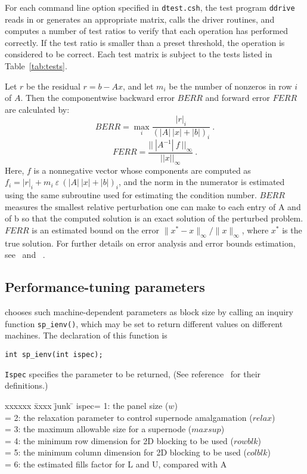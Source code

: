 For each command line option specified in {\tt dtest.csh}, the test program
{\tt ddrive} reads in or generates an appropriate matrix, calls the 
driver routines, and computes a number of test ratios to verify that 
each operation has performed correctly. If the test ratio is smaller than
a preset threshold, the operation is considered to be correct.
Each test matrix is subject to the tests listed in Table~\ref{tab:tests}.

Let $r$ be the residual $r=b-Ax$, and let $m_i$ be the number of nonzeros in 
row $i$ of $A$. Then the componentwise backward error $BERR$ and 
forward error $FERR$~\cite{lapackmanual2} are calculated by:
$$ BERR = \max_i\frac{|r|_i}{(|A|~|x|+|b|)_i}\ .$$
$$FERR = \frac{||~|A^{-1}|~f~||_\infty}{||x||_\infty}\ .$$
Here, $f$ is a nonnegative vector whose components are computed as
$f_i=|r|_i + m_i~\varepsilon~(|A|~|x|+|b|)_i$, and the norm in the numerator 
is estimated using the same subroutine used for estimating the
condition number. 
$BERR$ measures the smallest relative perturbation one can make to each 
entry of A and of b so that the computed solution is an exact
solution of the perturbed problem. $FERR$ is an estimated bound on 
the error $\| x^* - x \|_{\infty} / \| x \|_{\infty}$, where $x^*$ is 
the true solution.
For further details on error analysis and error bounds
estimation, see~\cite[Chapter 4]{lapackmanual2} and ~\cite{arioli89}.


\subsection{Performance-tuning parameters}
\label{sec:parameters}
{\superlu} chooses such machine-dependent parameters as block size by calling
an inquiry function {\tt sp\_ienv()}, which may be set to return different
values on different machines. The declaration of this function is

\vspace{.1in}
{\tt int sp\_ienv(int ispec);}
\vspace{.1in}

{\tt Ispec} specifies the parameter to be returned,
(See reference~\cite{superlu99} for their definitions.)
\begin{tabbing}
xxxxxx \= xxxx \= junk \= \kill
\>ispec\>= 1: the panel size ($w$)\\
\>     \>= 2: the relaxation parameter to control supernode amalgamation 
              ($relax$)\\
\>     \>= 3: the maximum allowable size for a supernode ($maxsup$)\\
\>     \>= 4: the minimum row dimension for 2D blocking to be used ($rowblk$)\\
\>     \>= 5: the minimum column dimension for 2D blocking to be used ($colblk$)\\
\>     \>= 6: the estimated fills factor for L and U, compared with A
\end{tabbing}	    

